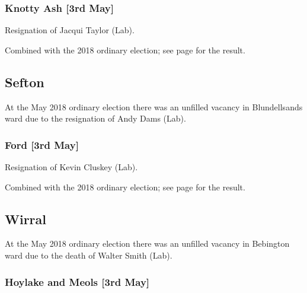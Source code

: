 \documentclass[a4paper,openany]{book}
\begin{document}
\begin{resultsiii}
\subsubsection*{Knotty Ash \hspace*{\fill}\nolinebreak[1]%
\enspace\hspace*{\fill}
[3rd May]}


Resignation of Jacqui Taylor (Lab).

Combined with the 2018 ordinary election; see page \pageref{KnottyAshLiverpool} for the result.

\subsection*{Sefton}

At the May 2018 ordinary election there was an unfilled vacancy in Blundellsands ward due to the resignation of Andy Dams (Lab).

\subsubsection*{Ford \hspace*{\fill}\nolinebreak[1]%
\enspace\hspace*{\fill}
[3rd May]}


Resignation of Kevin Cluskey (Lab).

Combined with the 2018 ordinary election; see page \pageref{FordSefton} for the result.

\subsection*{Wirral}

At the May 2018 ordinary election there was an unfilled vacancy in Bebington ward due to the death of Walter Smith (Lab).

\subsubsection*{Hoylake and Meols \hspace*{\fill}\nolinebreak[1]%
\enspace\hspace*{\fill}
[3rd May]}


\end{resultsiii}
\end{document}
